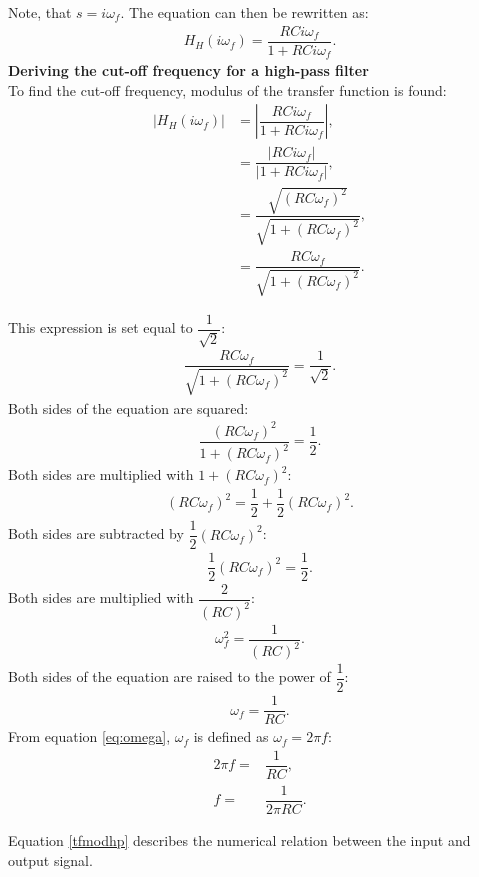 Note, that $s=i\omega_f$. The equation can then be rewritten as:
\begin{align*}
H_{H}(i \omega_f) = \dfrac{RCi \omega_f}{1 + RCi \omega_f}.
\end{align*}
\textbf{Deriving the cut-off frequency for a high-pass filter} \\
To find the cut-off frequency, modulus of the transfer function is found:
\begin{align}
\left|H_{H}(i \omega_f)\right| &= \left|\dfrac{RCi \omega_f}{1 + RCi \omega_f} \right|, \nonumber \\
 &= \dfrac{|RCi \omega_f|}{|1 + RCi \omega_f |}, \nonumber \\
 &= \dfrac{\sqrt{(RC \omega_f)^2}}{\sqrt{1 + (RC \omega_f)^2 }}, \nonumber \\
 &= \dfrac{RC \omega_f}{\sqrt{1 + (RC \omega_f)^2 }}. \label{tfmodhp}
\end{align} 

\noindent This expression is set equal to $\dfrac{1}{\sqrt{2}}$:
\begin{align*}
\dfrac{RC \omega_f}{\sqrt{1 + (RC \omega_f)^2 }}=\dfrac{1}{\sqrt{2}}.
\end{align*}
Both sides of the equation are squared:
\begin{align*}
\dfrac{(RC \omega_f)^2}{1 + (RC \omega_f)^2 }=\dfrac{1}{2}.
\end{align*}
Both sides are multiplied with $1+(RC\omega_f)^2$:
\begin{align*}
(RC \omega_f)^2 =\dfrac{1}{2}+\dfrac{1}{2}(RC\omega_f)^2.
\end{align*}
Both sides are subtracted  by $\dfrac{1}{2}(RC\omega_f)^2$:
\begin{align*}
\dfrac{1}{2}(RC \omega_f)^2 =\dfrac{1}{2}.
\end{align*}
Both sides are multiplied with $\dfrac{2}{(RC)^2}$:
\begin{align*}
\omega_f^2 =\dfrac{1}{(RC)^2}.
\end{align*}
Both sides of the equation are raised to the power of $\dfrac{1}{2}$:
\begin{align*}
\omega_f =\dfrac{1}{RC}.
\end{align*}
From equation \eqref{eq:omega}, $\omega_f$ is defined as $\omega_f=2 \pi f$:
\begin{align*}
2\pi f=&\dfrac{1}{RC},
\\
f=&\dfrac{1}{2\pi RC}.
\end{align*}

\noindent Equation \eqref{tfmodhp} describes the numerical relation between the input and output signal.


